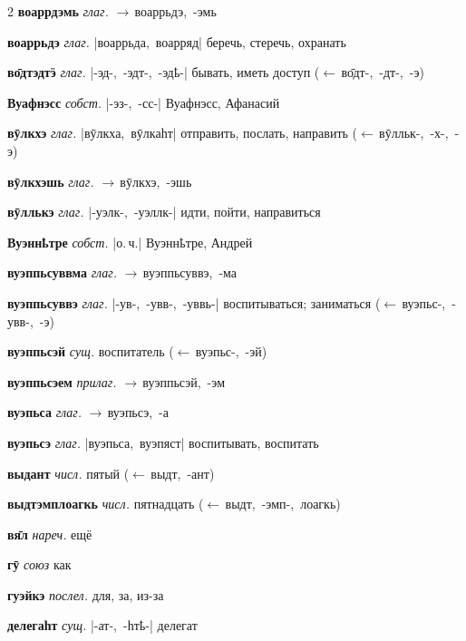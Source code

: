 \documentclass[10pt, a5paper,openany,twoside]{ksdp}
\begin{document}
\begin{multicols}{2}
\textbf{воаррдэмь} \textit{глаг.} \mbox{$\rightarrow$\,воаррьдэ, -эмь}

\textbf{воаррьдэ} \textit{глаг.} \mbox{|воаррьда, воарряд|} беречь, стеречь, охранать

\textbf{во̄дтэдтӭ} \textit{глаг.} \mbox{|-эд-, -эдт-, -эдҍ-|} бывать, иметь доступ \mbox{($\leftarrow$\,во̄дт-, -дт-, -э)}

\textbf{Вуафнэсс} \textit{собст.} \mbox{|-эз-, -сс-|} Вуафнэсс, Афанасий

\textbf{вӯлкхэ} \textit{глаг.} \mbox{|вӯлкха, вӯлкаһт|} отправить, послать, направить \mbox{($\leftarrow$\,вӯлльк-, -х-, -э)}

\textbf{вӯлкхэшь} \textit{глаг.} \mbox{$\rightarrow$\,вӯлкхэ, -эшь}

\textbf{вӯллькэ} \textit{глаг.} \mbox{|-уэлк-, -уэллк-|} идти, пойти, направиться

\textbf{Вуэннҍтре} \textit{собст.} \mbox{|о.\,ч.|} Вуэннҍтре, Андрей

\textbf{вуэппьсуввма} \textit{глаг.} \mbox{$\rightarrow$\,вуэппьсуввэ, -ма}

\textbf{вуэппьсуввэ} \textit{глаг.} \mbox{|-ув-, -увв-, -уввь-|} воспитываться; заниматься \mbox{($\leftarrow$\,вуэпьс-, -увв-, -э)}

\textbf{вуэппьсэй} \textit{сущ.} воспитатель \mbox{($\leftarrow$\,вуэпьс-, -эй)} 

\textbf{вуэппьсэем} \textit{прилаг.} \mbox{$\rightarrow$\,вуэппьсэй, -эм}

\textbf{вуэпьса} \textit{глаг.} \mbox{$\rightarrow$\,вуэпьсэ, -а}

\textbf{вуэпьсэ} \textit{глаг.} \mbox{|вуэпьса, вуэпяст|} воспитывать, воспитать

\textbf{выдант} \textit{числ.} пятый \mbox{($\leftarrow$\,выдт, -ант)}

\textbf{выдтэмплоагкь} \textit{числ.} пятнадцать \mbox{($\leftarrow$\,выдт, -эмп-, лоагкь)}

\textbf{вя̄л} \textit{нареч.} ещё

\vspace*{\baselineskip}

\textbf{гӯ} \textit{союз} как

\textbf{гуэйкэ} \textit{послел.} для, за, из-за

\vspace*{\baselineskip}

\textbf{делегаһт} \textit{сущ.} \mbox{|-ат-, -һтҍ-|} делегат

\vspace*{\baselineskip}


\end{multicols}
\end{document}
